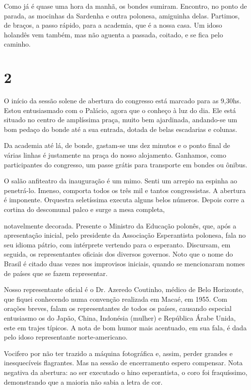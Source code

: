 Como já é quase uma hora da manhã, os bondes sumiram. Encontro, no ponto de parada, as mocinhas da Sardenha e outra polonesa, amiguinha delas. Partimos, de braços, a passo rápido, para a academia, que é a nossa casa. Um idoso holandês vem também, mas não aguenta a passada, coitado, e se fica pelo caminho.

\section*{2 \adfflatleafright {}}
O início da sessão solene de abertura do congresso está marcado para as 9,30hs. Estou entusiasmado com o Palácio, agora que o conheço à luz do dia. Ele está situado no centro de amplíssima praça, muito bem ajardinada, andando-se um bom pedaço do bonde até a sua entrada, dotada de belas escadarias e colunas.

Da academia até lá, de bonde, gastam-se uns dez minutos e o ponto final de várias linhas é justamente na praça do nosso alojamento. Ganhamos, como participantes do congresso, um passe grátis para transporte em bondes ou ônibus.

O salão anfiteatro da inauguração é um mimo. Senti um arrepio na espinha ao penetrá-lo. Imenso, comporta todos os três mil e tantos congressistas. A abertura é imponente. Orquestra seletíssima executa alguns belos números. Depois corre a cortina do descomunal palco e surge a mesa completa,

notavelmente decorada. Presente o Ministro da Educação polonês, que, após a apresentação inicial, pelo presidente da Associação Esperantista polonesa, fala no seu idioma pátrio, com intérprete vertendo para o esperanto. Discursam, em seguida, os representantes oficiais dos diversos governos. Noto que o nome do Brasil é citado duas vezes nos improvisos iniciais, quando se mencionaram nomes de países que se fazem representar.

Nosso representante oficial é o Dr. Azeredo Coutinho, médico de Belo Horizonte, que fiquei conhecendo numa convenção realizada em Macaé, em 1955. Com orações breves, falam os representantes de todos os países, causando especial entusiasmo os do Japão, China, Indonésia (mulher) e República Árabe Unida, este em trajes típicos. A nota de bom humor mais acentuado, em sua fala, é dada pelo idoso representante norte-americano.

Vocifero por não ter trazido a máquina fotográfica e, assim, perder grandes e inesquecíveis flagrantes. Mas na sessão de encerramento espero compensar. Nota negativa da abertura: ao ser executado o hino esperantista, o coro foi fraquíssimo, demonstrando que a maioria não sabia a letra de cor.


